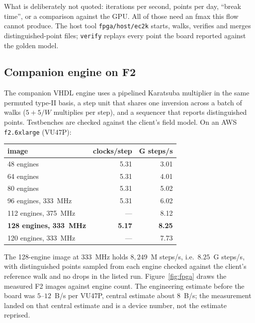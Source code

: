 What is deliberately not quoted: iterations per second, points per
day, ``break time'', or a comparison against the GPU. All of those
need an fmax this flow cannot produce. The host tool
\texttt{fpga/host/ec2k} starts, walks, verifies and merges
distinguished-point files; \texttt{verify} replays every point the
board reported against the golden model.

\subsection{Companion engine on F2}
\label{sec:fpga-f2}

The companion VHDL engine uses a pipelined Karatsuba multiplier in
the same permuted type-II basis, a step unit that shares one inversion
across a batch of walks ($5+5/W$ multiplies per step), and a sequencer
that reports distinguished points. Testbenches are checked against
the client's field model. On an AWS \texttt{f2.6xlarge} (VU47P):

\begin{center}
\small
\begin{tabular}{@{}lrr@{}}
\toprule
image & clocks/step & G steps/s \\
\midrule
48 engines & 5.31 & 3.01 \\
64 engines & 5.31 & 4.01 \\
80 engines & 5.31 & 5.02 \\
96 engines, 333~MHz & 5.31 & 6.02 \\
112 engines, 375~MHz & --- & 8.12 \\
\textbf{128 engines, 333~MHz} & \textbf{5.17} & \textbf{8.25} \\
120 engines, 333~MHz & --- & 7.73 \\
\bottomrule
\end{tabular}
\end{center}

The 128-engine image at 333~MHz holds $8{,}249$~M steps/s, i.e.\
$8.25$~G steps/s, with distinguished points sampled from each engine
checked against the client's reference walk and no drops in the listed
run.\art{crypto:hdl/ecc2k130/README.md}
Figure~\ref{fig:fpga} draws the measured F2 images against engine
count. The engineering estimate before the board was $5$--$12$~B/s per
VU47P, central estimate about $8$~B/s; the measurement landed on that
central estimate and is a device number, not the estimate
reprised.

